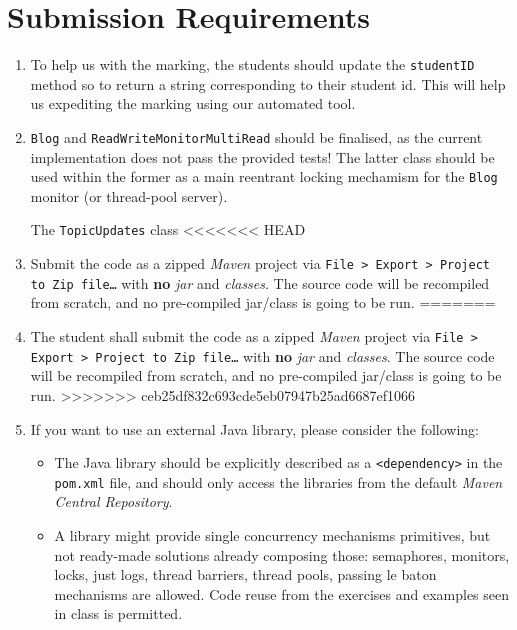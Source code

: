 \documentclass{article}
\begin{document}
	\section*{Submission Requirements}
	\begin{enumerate}
\item To help us with the marking, the students should update the \texttt{studentID} method so to return a string corresponding to their student id. This will help us expediting the marking using our automated tool.
		\item \texttt{Blog} and \texttt{ReadWriteMonitorMultiRead} should be finalised, as the current implementation does not pass the provided tests! The latter class should be used within the former as a main reentrant locking mechamism for the \texttt{Blog} monitor (or thread-pool server). 

The \texttt{TopicUpdates} class 
<<<<<<< HEAD
		\item Submit the code as a zipped \textit{Maven} project via \texttt{File > Export > Project to Zip file\dots} with \textbf{no} \textit{jar} and \textit{classes}. The source code will be recompiled from scratch, and no pre-compiled jar/class is going to be run.
=======
		\item The student shall submit the code as a zipped \textit{Maven} project via \texttt{File > Export > Project to Zip file\dots} with \textbf{no} \textit{jar} and \textit{classes}. The source code will be recompiled from scratch, and no pre-compiled jar/class is going to be run.
>>>>>>> ceb25df832c693cde5eb07947b25ad6687ef1066
		 
		\item If you want to use an external Java library, please consider the following:
		\begin{itemize}
			\item The Java library should be explicitly described as a \texttt{<dependency>} in the \texttt{pom.xml} file, and should only access the libraries from the default \textit{Maven Central Repository}.
			\item A library might provide single concurrency mechanisms primitives, but not ready-made solutions already composing those: semaphores, monitors, locks, just logs, thread barriers, thread pools, passing le baton mechanisms are allowed. Code reuse from the exercises and examples seen in class is permitted.
			

\end{itemize}
\end{enumerate}
\end{document}
